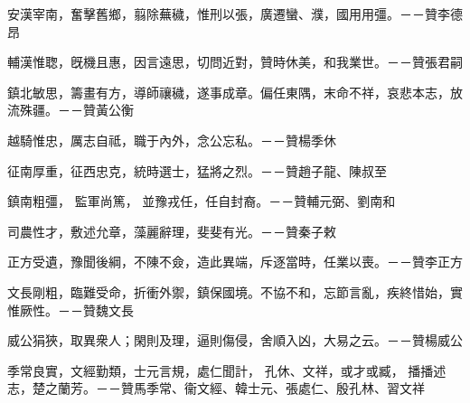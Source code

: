 \begin{pinyinscope}
 
 
 
 安漢宰南，奮擊舊鄉，翦除蕪穢，惟刑以張，廣遷蠻、濮，國用用彊。－－贊李德昂
 
 
 
 
 輔漢惟聦，旣機且惠，因言遠思，切問近對，贊時休美，和我業世。－－贊張君嗣
 
 
 
 
 鎮北敏思，籌畫有方，導師禳穢，遂事成章。偏任東隅，末命不祥，哀悲本志，放流殊疆。－－贊黃公衡
 
 
 
 
 越騎惟忠，厲志自祗，職于內外，念公忘私。－－贊楊季休
 
 
征南厚重，征西忠克，統時選士，猛將之烈。－－贊趙子龍、陳叔至
 
 
鎮南粗彊，
 監軍尚篤，
 並豫戎任，任自封裔。－－贊輔元弼、劉南和
 
 
 
 
 司農性才，敷述允章，藻麗辭理，斐斐有光。－－贊秦子敕
 
 
 
 
 正方受遺，豫聞後綱，不陳不僉，造此異端，斥逐當時，任業以喪。－－贊李正方
 
 
 
 
 文長剛粗，臨難受命，折衝外禦，鎮保國境。不協不和，忘節言亂，疾終惜始，實惟厥性。－－贊魏文長
 
 
 
 
 威公狷狹，取異衆人；閑則及理，逼則傷侵，舍順入凶，大易之云。－－贊楊威公
 
 
季常良實，文經勤類，士元言規，處仁聞計，
 孔休、文祥，或才或臧，
 播播述志，楚之蘭芳。－－贊馬季常、衞文經、韓士元、張處仁、殷孔林、習文祥
 

\end{pinyinscope}
